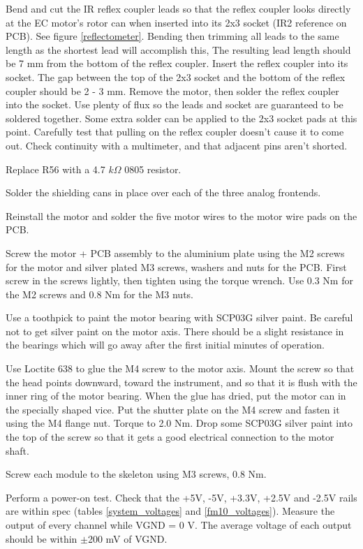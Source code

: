 \documentclass{article}
\begin{document}
Bend and cut the IR reflex coupler leads so that the reflex coupler looks directly at the EC motor's rotor can when inserted into its 2x3 socket (IR2 reference on PCB). See figure \vref{reflectometer}.
Bending then trimming all leads to the same length as the shortest lead will accomplish this,
The resulting lead length should be 7 mm from the bottom of the reflex coupler.
Insert the reflex coupler into its socket.
The gap between the top of the 2x3 socket and the bottom of the reflex coupler should be 2 - 3 mm.
Remove the motor, then solder the reflex coupler into the socket.
Use plenty of flux so the leads and socket are guaranteed to be soldered together.
Some extra solder can be applied to the 2x3 socket pads at this point.
Carefully test that pulling on the reflex coupler doesn't cause it to come out.
Check continuity with a multimeter, and that adjacent pins aren't shorted.

Replace R56 with a 4.7 $k\Omega$ 0805 resistor.

Solder the shielding cans in place over each of the three analog frontends.

Reinstall the motor and solder the five motor wires to the motor wire pads on the PCB.

Screw the motor + PCB assembly to the aluminium plate using the M2 screws for the motor and silver plated M3 screws, washers and nuts for the PCB.
First screw in the screws lightly, then tighten using the torque wrench. Use 0.3 Nm for the M2 screws and 0.8 Nm for the M3 nuts.

Use a toothpick to paint the motor bearing with SCP03G silver paint.
Be careful not to get silver paint on the motor axis.
There should be a slight resistance in the bearings which will go away after the first initial minutes of operation.

Use Loctite 638 to glue the M4 screw to the motor axis.
Mount the screw so that the head points downward, toward the instrument,
and so that it is flush with the inner ring of the motor bearing.
When the glue has dried, put the motor can in the specially shaped vice.
Put the shutter plate on the M4 screw and fasten it using the M4 flange nut.
Torque to 2.0 Nm.
Drop some SCP03G silver paint into the top of the screw so that it gets a good electrical connection to the motor shaft.

Screw each module to the skeleton using M3 screws, 0.8 Nm.

Perform a power-on test.
Check that the +5V, -5V, +3.3V, +2.5V and -2.5V rails are within spec (tables \ref{system_voltages} and \ref{fm10_voltages}).
Measure the output of every channel while VGND = 0 V. The average voltage of each output should be within $\pm$200 mV of VGND.
\end{document}
